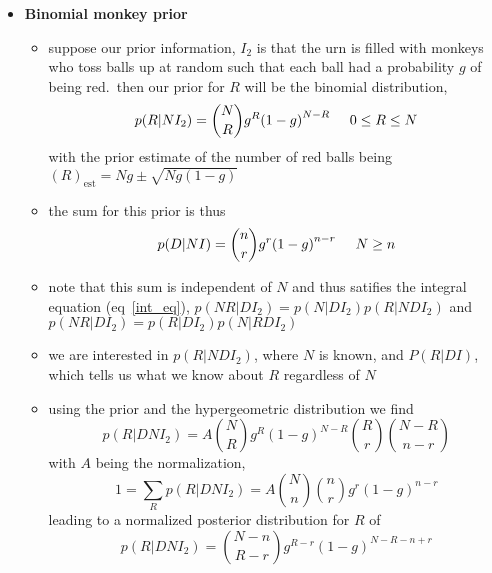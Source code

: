 \documentclass[../jaynes_prob_theory_notes.tex]{subfiles}
\begin{document}
\begin{itemize}
        \item \textbf{Binomial monkey prior}
            \begin{itemize}
                \item suppose our prior information, $I_2$ is that the urn is filled with monkeys who toss balls up at random such that each ball had a probability $g$ of being red.\ then our prior for $R$ will be the binomial distribution,
                    \begin{equation*}
                        p(R|NI_2) = \binom{N}{R} g^{R}{(1-g)}^{N-R} \hspace{0.5cm} 0 \leq R \leq N
                    \end{equation*}
                with the prior estimate of the number of red balls being ${(R)}_{\mathrm{est}} = Ng \pm \sqrt{Ng(1-g)}$
                \item the sum for this prior is thus
                    \begin{equation*}
                        p(D|NI) = \binom{n}{r} g^{r}{(1-g)}^{n-r} \hspace{0.5cm} N \geq n
                    \end{equation*}
                \item note that this sum is independent of $N$ and thus satifies the integral equation (eq~\ref{int_eq}), $p(NR|DI_2) = p(N|DI_2)p(R|NDI_2)$ and $p(NR|DI_2) = p(R|DI_2)p(N|RDI_2)$
                \item we are interested in $p(R|NDI_2)$, where $N$ is known, and $P(R|DI)$, which tells us what we know about $R$ regardless of $N$
                \item using the prior and the hypergeometric distribution we find 
                    \begin{equation*}
                        p(R|DNI_2) = A \binom{N}{R} g^{R}{(1-g)}^{N-R} \binom{R}{r} \binom{N-R}{n-r}
                    \end{equation*}
                with $A$ being the normalization,
                    \begin{equation*}
                        1 = \sum_{R}p(R|DNI_2) = A \binom{N}{n} \binom{n}{r}g^{r}{(1-g)}^{n-r}
                    \end{equation*}
                leading to a normalized posterior distribution for $R$ of 
                    \begin{equation}
                        \label{binom_monk_pos}
                        p(R|DNI_2) = \binom{N-n}{R-r} g^{R-r}{(1-g)}^{N-R-n+r}

\end{equation}
\end{itemize}
\end{itemize}
\end{document}
